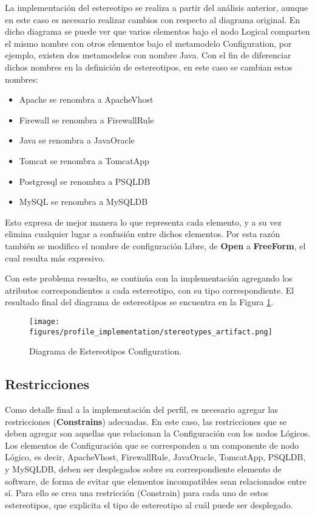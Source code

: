 La implementación del estereotipo se realiza a partir del análisis anterior, aunque en este caso es necesario realizar cambios con respecto al diagrama original. En dicho diagrama se puede ver que varios elementos bajo el nodo Logical comparten el mismo nombre con otros elementos bajo el metamodelo Configuration, por ejemplo, existen dos metamodelos con nombre Java.
Con el fin de diferenciar dichos nombres en la definición de estereotipos, en este caso se cambian estos nombres:
\begin{itemize}
    \item Apache se renombra a ApacheVhost
    \item Firewall se renombra a FirewallRule
    \item Java se renombra a JavaOracle
    \item Tomcat se renombra a TomcatApp
    \item Postgresql se renombra a PSQLDB
    \item MySQL se renombra a MySQLDB
\end{itemize}

Esto expresa de mejor manera lo que representa cada elemento, y a su vez elimina cualquier lugar a confusión entre dichos elementos. Por esta razón también se modifico el nombre de configuración Libre, de \textbf{Open} a \textbf{FreeForm}, el cual resulta más expresivo.

Con este problema resuelto, se continúa con la implementación agregando los atributos correspondientes a cada estereotipo, con su tipo correspondiente.
El resultado final del diagrama de estereotipos se encuentra en la Figura \ref{fig:profile:artifact}.

\begin{figure}[htbp]
    \centering
    \texttt{[image: figures/profile\_implementation/stereotypes\_artifact.png]}
    \caption{Diagrama de Estereotipos Configuration.}
    \label{fig:profile:artifact}
\end{figure}

\subsection{Restricciones}
Como detalle final a la implementación del perfil, es necesario agregar las restricciones (\textbf{Constrains}) adecuadas. En este caso, las restricciones que se deben agregar son aquellas que relacionan la Configuración con los nodos Lógicos. Los elementos de Configuración que se corresponden a un componente de nodo Lógico, es decir, ApacheVhost, FirewallRule, JavaOracle, TomcatApp, PSQLDB, y MySQLDB, deben ser desplegados sobre su correspondiente elemento de software, de forma de evitar que elementos incompatibles sean relacionados entre sí.
Para ello se crea una restricción (Constrain) para cada uno de estos estereotipos, que explicita el tipo de estereotipo al cuál puede ser desplegado.


